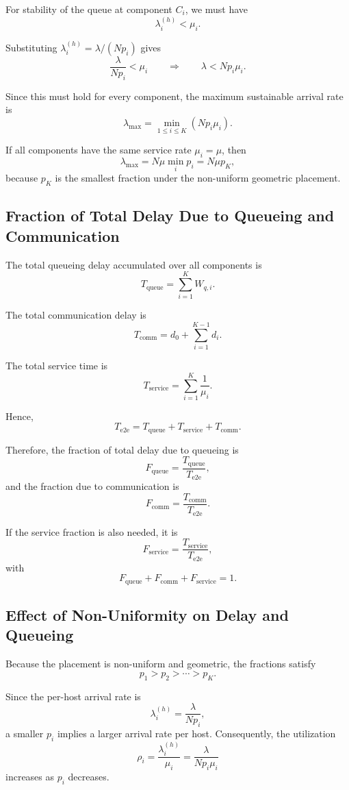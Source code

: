 \documentclass[12pt,a4paper]{article}
\begin{document}
For stability of the queue at component $C_i$, we must have
\[
\lambda_i^{(h)} < \mu_i.
\]

Substituting $\lambda_i^{(h)} = \lambda/(Np_i)$ gives
\[
\frac{\lambda}{Np_i} < \mu_i
\qquad \Longrightarrow \qquad
\lambda < Np_i\mu_i.
\]

Since this must hold for every component, the maximum sustainable arrival rate is
\[
\lambda_{\max} = \min_{1 \le i \le K} \left(Np_i\mu_i\right).
\]

If all components have the same service rate $\mu_i=\mu$, then
\[
\lambda_{\max} = N\mu \min_i p_i = N\mu p_K,
\]
because $p_K$ is the smallest fraction under the non-uniform geometric placement.

\subsection{Fraction of Total Delay Due to Queueing and Communication}

The total queueing delay accumulated over all components is
\[
T_{\text{queue}} = \sum_{i=1}^{K} W_{q,i}.
\]

The total communication delay is
\[
T_{\text{comm}} = d_0 + \sum_{i=1}^{K-1} d_i.
\]

The total service time is
\[
T_{\text{service}} = \sum_{i=1}^{K} \frac{1}{\mu_i}.
\]

Hence,
\[
T_{\text{e2e}} = T_{\text{queue}} + T_{\text{service}} + T_{\text{comm}}.
\]

Therefore, the fraction of total delay due to queueing is
\[
F_{\text{queue}} = \frac{T_{\text{queue}}}{T_{\text{e2e}}},
\]
and the fraction due to communication is
\[
F_{\text{comm}} = \frac{T_{\text{comm}}}{T_{\text{e2e}}}.
\]

If the service fraction is also needed, it is
\[
F_{\text{service}} = \frac{T_{\text{service}}}{T_{\text{e2e}}},
\]
with
\[
F_{\text{queue}} + F_{\text{comm}} + F_{\text{service}} = 1.
\]

\subsection{Effect of Non-Uniformity on Delay and Queueing}

Because the placement is non-uniform and geometric, the fractions satisfy
\[
p_1 > p_2 > \cdots > p_K.
\]

Since the per-host arrival rate is
\[
\lambda_i^{(h)} = \frac{\lambda}{Np_i},
\]
a smaller $p_i$ implies a larger arrival rate per host. Consequently, the utilization
\[
\rho_i = \frac{\lambda_i^{(h)}}{\mu_i}
       = \frac{\lambda}{Np_i\mu_i}
\]
increases as $p_i$ decreases.
\end{document}
